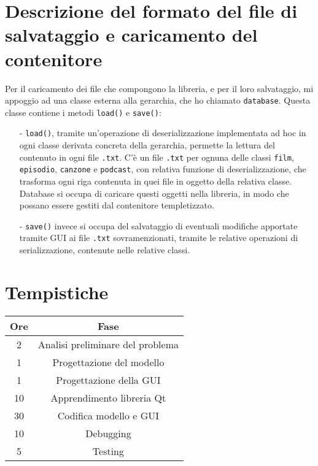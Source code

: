 \documentclass[a4paper,10pt]{article}
\begin{document}
\section{Descrizione del formato del file di salvataggio e caricamento del contenitore}
Per il caricamento dei file che compongono la libreria, e per il loro salvataggio, mi appoggio ad una classe esterna alla gerarchia, che ho chiamato \texttt{database}. Questa classe contiene i metodi \texttt{load()} e \texttt{save()}: 
\begin{enumerate}
\item[-] \texttt{load()}, tramite un'operazione di deserializzazione implementata ad hoc in ogni classe derivata concreta della gerarchia, permette la lettura del contenuto in ogni file \texttt{.txt}. C'è un file \texttt{.txt} per ognuna delle classi \texttt{film}, \texttt{episodio}, \texttt{canzone} e \texttt{podcast}, con relativa funzione di deserializzazione, che trasforma ogni riga contenuta in quei file in oggetto della relativa classe. Database si occupa di caricare questi oggetti nella libreria, in modo che possano essere gestiti dal contenitore templetizzato.
\item[-] \texttt{save()} invece si occupa del salvataggio di eventuali modifiche apportate tramite GUI ai file \texttt{.txt} sovramenzionati, tramite le relative operazioni di serializzazione, contenute nelle relative classi. 
\end{enumerate}

\section{Tempistiche}

\begin{center}
 \begin{tabular}{||c | c ||} 
 \hline
 \textbf{Ore} & \textbf{Fase}  \\ 
 \hline\hline
 2 & Analisi preliminare del problema \\ 
 \hline
 1 & Progettazione del modello \\
 \hline
 1 & Progettazione della GUI\\
 \hline
 10 & Apprendimento libreria Qt \\
 \hline
 30 & Codifica modello e GUI\\ 
 \hline
 10 & Debugging \\
 \hline
 5 & Testing\\
 \hline
\end{tabular}
\end{center}
\end{document}
